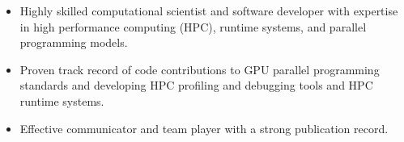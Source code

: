 
\selectfont
\begin{itemize}
    \item Highly skilled computational scientist and software developer with expertise in high performance computing (HPC), runtime systems, and parallel programming models. 
    \item Proven track record of code contributions to GPU parallel programming standards and developing HPC profiling and debugging tools and HPC runtime systems. 
    \item Effective communicator and team player with a strong publication record.
\end{itemize}
